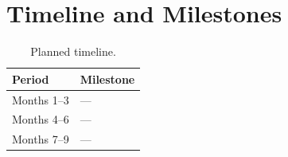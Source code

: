\section{Timeline and Milestones}
\label{sec:future-timeline}


\begin{table}[H]
  \centering
  \caption{Planned timeline.}
  \label{tab:timeline}
  \begin{tabular}{ll}
    \toprule
    Period & Milestone \\
    \midrule
    Months 1--3 & --- \\
    Months 4--6 & --- \\
    Months 7--9 & --- \\
    \bottomrule
  \end{tabular}
\end{table}
